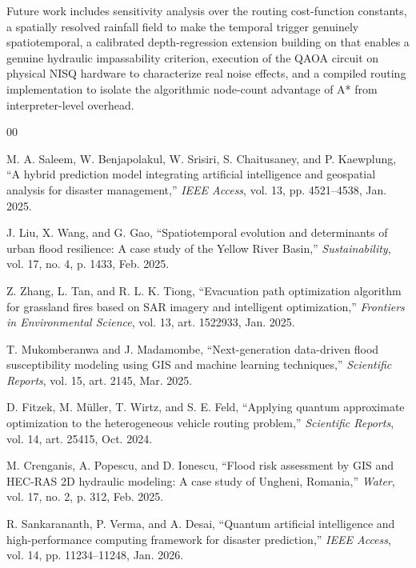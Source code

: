 \documentclass[conference]{IEEEtran}
\begin{document}
Future work includes sensitivity analysis over the routing cost-function constants, a spatially resolved rainfall field to make the temporal trigger genuinely spatiotemporal, a calibrated depth-regression extension building on \cite{sadhwani2026} that enables a genuine hydraulic impassability criterion, execution of the QAOA circuit on physical NISQ hardware to characterize real noise effects, and a compiled routing implementation to isolate the algorithmic node-count advantage of A* from interpreter-level overhead.


\begin{thebibliography}{00}

 M. A. Saleem, W. Benjapolakul, W. Srisiri, S. Chaitusaney, and P. Kaewplung, ``A hybrid prediction model integrating artificial intelligence and geospatial analysis for disaster management,'' \emph{IEEE Access}, vol. 13, pp. 4521--4538, Jan. 2025.

 J. Liu, X. Wang, and G. Gao, ``Spatiotemporal evolution and determinants of urban flood resilience: A case study of the Yellow River Basin,'' \emph{Sustainability}, vol. 17, no. 4, p. 1433, Feb. 2025.

 Z. Zhang, L. Tan, and R. L. K. Tiong, ``Evacuation path optimization algorithm for grassland fires based on SAR imagery and intelligent optimization,'' \emph{Frontiers in Environmental Science}, vol. 13, art. 1522933, Jan. 2025.

 T. Mukomberanwa and J. Madamombe, ``Next-generation data-driven flood susceptibility modeling using GIS and machine learning techniques,'' \emph{Scientific Reports}, vol. 15, art. 2145, Mar. 2025.

 D. Fitzek, M. M\"uller, T. Wirtz, and S. E. Feld, ``Applying quantum approximate optimization to the heterogeneous vehicle routing problem,'' \emph{Scientific Reports}, vol. 14, art. 25415, Oct. 2024.

 M. Crenganis, A. Popescu, and D. Ionescu, ``Flood risk assessment by GIS and HEC-RAS 2D hydraulic modeling: A case study of Ungheni, Romania,'' \emph{Water}, vol. 17, no. 2, p. 312, Feb. 2025.

 R. Sankarananth, P. Verma, and A. Desai, ``Quantum artificial intelligence and high-performance computing framework for disaster prediction,'' \emph{IEEE Access}, vol. 14, pp. 11234--11248, Jan. 2026.


\end{thebibliography}
\end{document}
